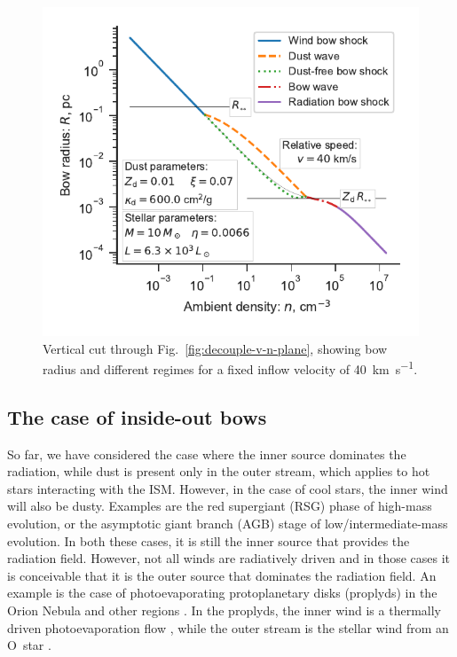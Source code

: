 \begin{figure}
  \includegraphics[width=\linewidth]{figs/decouple-v40-versus-n}
  \caption{Vertical cut through Fig.~\ref{fig:decouple-v-n-plane},
    showing bow radius and different regimes for a fixed inflow
    velocity of \SI{40}{km.s^{-1}}.}
  \label{fig:decouple-v40-versus-n}
\end{figure}


\subsection{The case of inside-out bows}
\label{sec:case-inside-out}

So far, we have considered the case where the inner source dominates
the radiation, while dust is present only in the outer stream, which
applies to hot stars interacting with the ISM.  However, in the case
of cool stars, the inner wind will also be dusty.  Examples are the
red supergiant (RSG) phase of high-mass evolution, or the asymptotic
giant branch (AGB) stage of low/intermediate-mass evolution.  In both
these cases, it is still the inner source that provides the radiation
field.  However, not all winds are radiatively driven and in those
cases it is conceivable that it is the outer source that dominates the
radiation field.  An example is the case of photoevaporating
protoplanetary disks (proplyds) in the Orion Nebula and other \hii{}
regions \citep{ODell:1994a}.  In the proplyds, the inner wind is a
thermally driven photoevaporation flow \citep{HA:1998, Henney:1999a},
while the outer stream is the stellar wind from an O~star
\citep{Garcia-Arredondo:2001a}.


